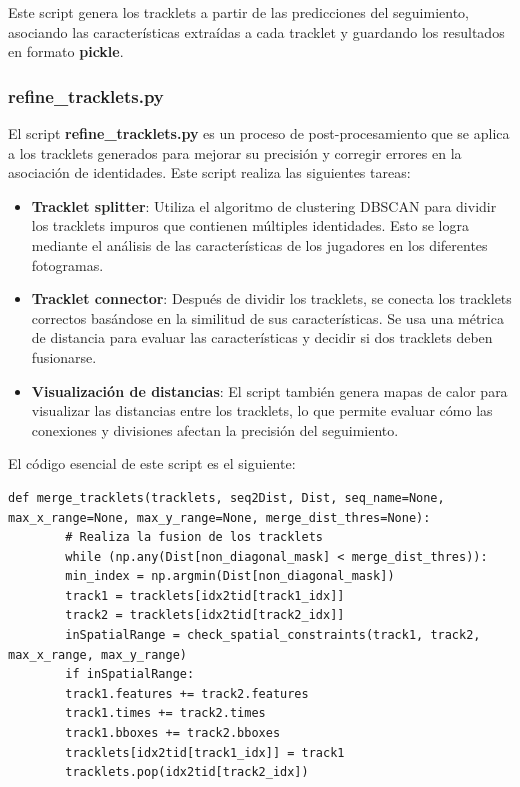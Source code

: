 \documentclass[12pt, a4paper, twoside]{article}
\begin{document}
	Este script genera los tracklets a partir de las predicciones del seguimiento, asociando las características extraídas a cada tracklet y guardando los resultados en formato \textbf{pickle}.
	
	\subsubsection{refine\_tracklets.py}
	
	El script \textbf{refine\_tracklets.py} es un proceso de post-procesamiento que se aplica a los tracklets generados para mejorar su precisión y corregir errores en la asociación de identidades. Este script realiza las siguientes tareas:
	
	\begin{itemize}
		\item \textbf{Tracklet splitter}: Utiliza el algoritmo de clustering DBSCAN para dividir los tracklets impuros que contienen múltiples identidades. Esto se logra mediante el análisis de las características de los jugadores en los diferentes fotogramas.
		\item \textbf{Tracklet connector}: Después de dividir los tracklets, se conecta los tracklets correctos basándose en la similitud de sus características. Se usa una métrica de distancia para evaluar las características y decidir si dos tracklets deben fusionarse.
		\item \textbf{Visualización de distancias}: El script también genera mapas de calor para visualizar las distancias entre los tracklets, lo que permite evaluar cómo las conexiones y divisiones afectan la precisión del seguimiento.
	\end{itemize}
	
	El código esencial de este script es el siguiente:
	
	\begin{lstlisting}[style=pythonstyle]
		def merge_tracklets(tracklets, seq2Dist, Dist, seq_name=None, max_x_range=None, max_y_range=None, merge_dist_thres=None):
		# Realiza la fusion de los tracklets
		while (np.any(Dist[non_diagonal_mask] < merge_dist_thres)):
		min_index = np.argmin(Dist[non_diagonal_mask])
		track1 = tracklets[idx2tid[track1_idx]]
		track2 = tracklets[idx2tid[track2_idx]]
		inSpatialRange = check_spatial_constraints(track1, track2, max_x_range, max_y_range)
		if inSpatialRange:
		track1.features += track2.features
		track1.times += track2.times
		track1.bboxes += track2.bboxes
		tracklets[idx2tid[track1_idx]] = track1
		tracklets.pop(idx2tid[track2_idx])
	\end{lstlisting}
	
\end{document}

